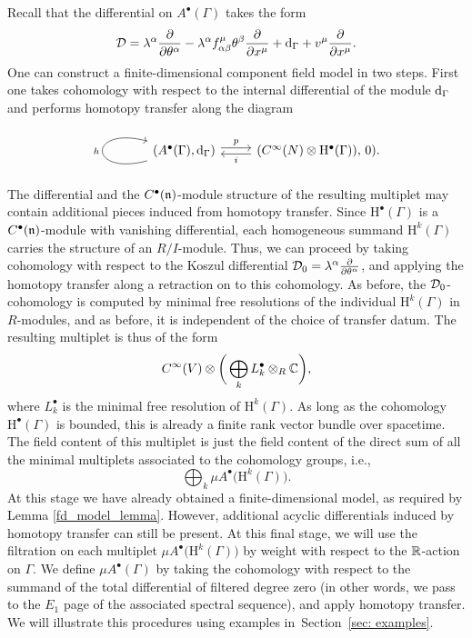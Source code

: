\documentclass[pdftex]{sigma}
\numberwithin{equation}{section}
\def\bu{\bullet}
\def\d{{\rm d}}
\begin{document}
Recall that the differential on $A^\bullet(\Gamma)$ takes the form
\begin{equation*}
\cD = \lambda^\alpha \frac{\partial}{\partial \theta^\alpha} - \lambda^\alpha f^\mu_{\alpha \beta} \theta^\beta \frac{\partial}{\partial x^\mu} + \d_\Gamma + v^\mu
\frac{\partial}{\partial x^\mu} .
\end{equation*}
One can construct a finite-dimensional component field model in two steps. First one takes cohomology with respect to the internal differential of the module $\d_\Gamma$ and performs homotopy transfer along the diagram
\begin{equation*}
\begin{tikzcd}
\arrow[loop left]{l}{h}(A^\bullet (\Gamma) , \d_\Gamma)\arrow[r, shift left, "p"] &(C^\infty(N) \otimes \mathrm H^\bullet(\Gamma) ) , \, 0)\arrow[l, shift left, "i"] .
\end{tikzcd}
\end{equation*}
The differential and the $C^\bullet(\mathfrak n)$-module structure of the resulting multiplet may contain additional pieces induced from homotopy transfer. Since $\mathrm H^\bullet(\Gamma)$ is a $C^\bullet(\mathfrak n)$-module with vanishing differential, each homogeneous summand $\mathrm H^k(\Gamma)$ carries the structure of an $R/I$-module. Thus, we can proceed by taking cohomology with respect to the Koszul differential $\mathcal D_0 = \lambda^\alpha \frac{\partial}{\partial \theta^\alpha}$, and applying the homotopy transfer along a retraction on to this cohomology. As before, the $\mathcal D_0$-cohomology is computed by minimal free resolutions of the individual $\mathrm H^k(\Gamma)$ in $R$-modules, and as before, it is independent of the choice of transfer datum. The resulting multiplet is thus of the form
\begin{equation*}
C^\infty(V) \otimes \bigg(\bigoplus_k L^\bullet_k \otimes_R \mathbb C\bigg) ,
\end{equation*}
where $L^\bullet_k$ is the minimal free resolution of $\mathrm H^k(\Gamma)$. As long as the cohomology $\mathrm H^\bullet(\Gamma)$ is bounded, this is already a finite rank vector bundle over spacetime. The field content of this multiplet is just the field content of the direct sum of all the minimal multiplets associated to the cohomology groups, i.e.,
\begin{equation*}
\bigoplus_k \mu A^\bu\big(\mathrm H^k(\Gamma)\big) .
\end{equation*}
At this stage we have already obtained a finite-dimensional model, as required by Lemma \ref{fd_model_lemma}. However, additional acyclic differentials induced by homotopy transfer can still be present. At this final stage, we will use the filtration on each multiplet $\mu A^\bu\big(\mathrm H^k(\Gamma)\big)$ by weight with respect to the $\mathbb R$-action on $\Gamma$. We define $\mu A^\bullet(\Gamma)$ by taking the cohomology with respect to the summand of the total differential of filtered degree zero (in other words, we pass to the $E_1$ page of the associated spectral sequence), and apply homotopy transfer. We will illustrate this procedures using examples in~Section~\ref{sec: examples}.
\end{document}
